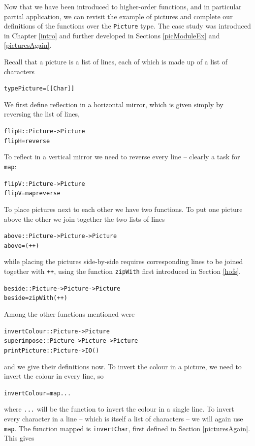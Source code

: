 Now that we have been introduced to higher-order functions, and in particular partial 
application, we can revisit the example of pictures  and complete our
definitions of the functions over the \texttt{Picture} type. The case
study was introduced in
Chapter \ref{intro} and further
developed in Sections \ref{picModuleEx} and \ref{picturesAgain}.

Recall that a picture is a list of lines, each of which is made up of a
list of characters
\begin{alltt}
type Picture = [[Char]]
\end{alltt}
We first define reflection in a horizontal mirror, which is given simply
by reversing the list of lines,
\begin{alltt}
flipH :: Picture -> Picture
flipH = reverse
\end{alltt}
To reflect in a vertical mirror we need to reverse every line -- clearly
a task for \texttt{map}:
\begin{alltt}
flipV :: Picture -> Picture
flipV = map reverse
\end{alltt}
To place pictures next to each other we have two functions. To put one
picture above
the other we join together the two lists of lines
\begin{alltt}
above :: Picture -> Picture -> Picture
above = (++)
\end{alltt}
while placing the pictures side-by-side requires corresponding lines to
be joined together with \texttt{++}, using the function \texttt{zipWith}
first introduced in Section \ref{hofs}.
\begin{alltt}
beside :: Picture -> Picture -> Picture
beside = zipWith (++)
\end{alltt}
Among the other functions mentioned were 
\begin{alltt}
invertColour :: Picture -> Picture
superimpose  :: Picture -> Picture -> Picture
printPicture :: Picture -> IO ()
\end{alltt}
and we give their definitions now. To invert the colour in a picture, we
need to invert the colour in every line, so
\begin{alltt}
invertColour = map ...
\end{alltt}
where \texttt{...} will be the function to invert the colour in a
single line.
To invert every character in a line -- which is itself a list of
characters -- we will again use \texttt{map}. The function mapped is
\texttt{invertChar}, first defined in Section \ref{picturesAgain}. This gives
